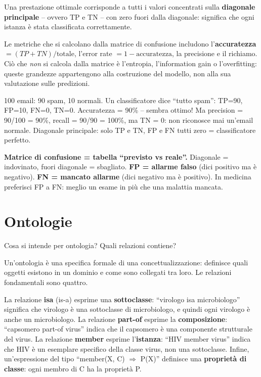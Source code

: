 \documentclass[12pt,a4paper]{article}
\begin{document}
Una prestazione ottimale corrisponde a tutti i valori concentrati sulla \textbf{diagonale principale} -- ovvero TP e TN -- con zero fuori dalla diagonale: significa che ogni istanza è stata classificata correttamente.

Le metriche che si calcolano dalla matrice di confusione includono l'\textbf{accuratezza} $= (TP + TN) / \text{totale}$, l'error rate $= 1 - \text{accuratezza}$, la precisione e il richiamo. Ciò che \emph{non} si calcola dalla matrice è l'entropia, l'information gain o l'overfitting: queste grandezze appartengono alla costruzione del modello, non alla sua valutazione sulle predizioni.

\begin{esempiobox}
100 email: 90 spam, 10 normali. Un classificatore dice ``tutto spam'': TP=90, FP=10, FN=0, TN=0. Accuratezza = 90\% -- sembra ottimo! Ma precision = 90/100 = 90\%, recall = 90/90 = 100\%, ma TN = 0: non riconosce mai un'email normale. Diagonale principale: solo TP e TN, FP e FN tutti zero = classificatore perfetto.
\end{esempiobox}

\begin{ricordabox}
\textbf{Matrice di confusione = tabella ``previsto vs reale''.} Diagonale = indovinato, fuori diagonale = sbagliato. \textbf{FP = allarme falso} (dici positivo ma è negativo). \textbf{FN = mancato allarme} (dici negativo ma è positivo). In medicina preferisci FP a FN: meglio un esame in più che una malattia mancata.
\end{ricordabox}

\section{Ontologie}

\begin{domandabox}{Cosa si intende per ontologia? Quali relazioni contiene?}
\end{domandabox}

Un'ontologia è una specifica formale di una concettualizzazione: definisce quali oggetti esistono in un dominio e come sono collegati tra loro. Le relazioni fondamentali sono quattro.

La relazione \textbf{isa} (is-a) esprime una \textbf{sottoclasse}: ``virologo isa microbiologo'' significa che virologo è una sottoclasse di microbiologo, e quindi ogni virologo è anche un microbiologo. La relazione \textbf{part-of} esprime la \textbf{composizione}: ``capsomero part-of virus'' indica che il capsomero è una componente strutturale del virus. La relazione \textbf{member} esprime l'\textbf{istanza}: ``HIV member virus'' indica che HIV è un esemplare specifico della classe virus, non una sottoclasse. Infine, un'espressione del tipo ``member(X, C) $\Rightarrow$ P(X)'' definisce una \textbf{proprietà di classe}: ogni membro di C ha la proprietà P.
\end{document}
